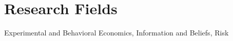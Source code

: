 \documentclass[10.5pt,a4paper]{moderncv}
\begin{document}
\makecvtitle



\section{Research Fields}
Experimental and Behavioral Economics, Information and Beliefs, Risk



















\end{document}
